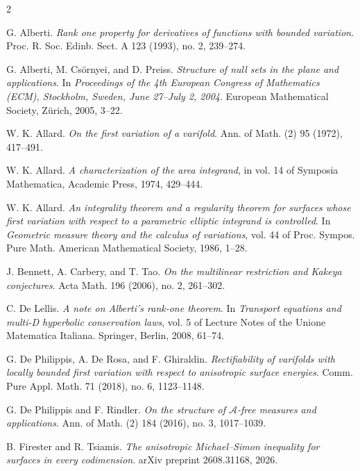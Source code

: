\documentclass[11pt,a4paper]{amsart}
\theoremstyle{definition}
\begin{document}
\frenchspacing

\begin{thebibliography}{2}

 G. Alberti.
\emph{Rank one property for derivatives of functions with bounded variation}.
Proc. R. Soc. Edinb. Sect. A 123 (1993), no. 2, 239--274.

G. Alberti, M. Cs\"ornyei, and D. Preiss.
\emph{Structure of null sets in the plane and applications}. In \emph{Proceedings of the 4th European Congress of Mathematics (ECM), Stockholm, Sweden, June 27--July 2, 2004}. European Mathematical Society, Z\"urich, 2005, 3--22. 

 W. K. Allard.
\emph{On the first variation of a varifold}.
{Ann. of Math. (2)} 95 (1972), 417--491. 

 W. K. Allard.
\emph{A characterization of the area integrand}, in vol. 14 of Symposia Mathematica, Academic Press, 1974, 429--444.

 W. K. Allard.
\emph{An integrality theorem and a regularity theorem for surfaces whose first variation with respect to a parametric elliptic integrand is controlled}.
In \emph{Geometric measure theory and the calculus of variations}, vol. 44 of Proc. Sympos. Pure Math. American Mathematical Society, 1986, 1--28.

  J. Bennett, A. Carbery, and T. Tao.
\emph{On the multilinear restriction and Kakeya conjectures}.
Acta Math. 196 (2006), no. 2, 261--302.

 C. De Lellis.
\emph{A note on Alberti’s rank-one theorem}.
In \emph{Transport equations and multi-D hyperbolic conservation laws},
vol. 5 of Lecture Notes of the Unione Matematica Italiana. Springer, Berlin, 2008, 61--74. 

 G. De Philippis, A. De Rosa, and F. Ghiraldin.
\emph{Rectifiability of varifolds with locally bounded first variation with respect to anisotropic surface energies}.
Comm. Pure Appl. Math. 71 (2018), no. 6, 1123--1148. 

 G. De Philippis and F. Rindler.
\emph{On the structure of $\mathcal{A}$-free measures and applications}.
{Ann. of Math. (2)} 184 (2016), no. 3, 1017--1039. 


 B. Firester and R. Tsiamis.
\emph{The anisotropic Michael--Simon inequality for surfaces in every codimension}.
arXiv preprint 2608.31168, 2026.


\end{thebibliography}
\end{document}
